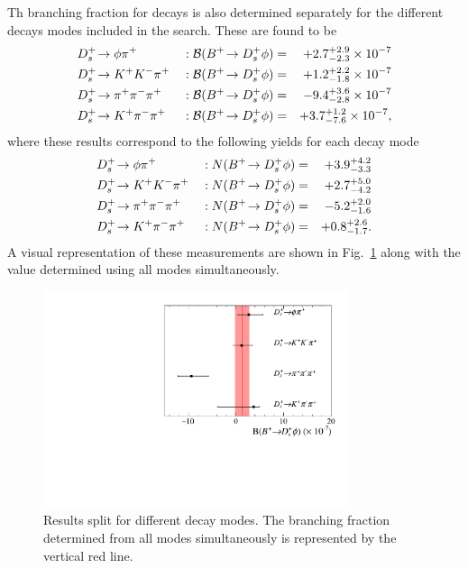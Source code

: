 {Th branching fraction for \decay{\Bp}{\Dsp\phiz} decays is also determined separately for the different \Dsp decays modes included in the search. These are found to be
\begin{equation}
  \left .
  \begin{aligned}
    &\decay{\Dsp}{\phiz\pip}      && : \BF(\decay{\Bp}{\Dsp\phiz}) = &+2.7^{+2.9}_{-2.3}\times 10^{-7}\\
    &\decay{\Dsp}{\Kp\Km\pip}     && : \BF(\decay{\Bp}{\Dsp\phiz}) = &+1.2^{+2.2}_{-1.8}\times 10^{-7}\\
    &\decay{\Dsp}{\pip\pim\pip}   && : \BF(\decay{\Bp}{\Dsp\phiz}) = &-9.4^{+3.6}_{-2.8}\times 10^{-7}\\
    &\decay{\Dsp}{\Kp\pim\pip}    && : \BF(\decay{\Bp}{\Dsp\phiz}) = &+3.7^{+1.2}_{-7.6}\times 10^{-7},\\
  \end{aligned} \right.
\end{equation} 
where these results correspond to the following yields for each \Dsp decay mode
\begin{equation}
  \left .
  \begin{aligned}
    &\decay{\Dsp}{\phiz\pip}      && : N(\decay{\Bp}{\Dsp\phiz}) = &+3.9^{+4.2}_{-3.3} \\
    &\decay{\Dsp}{\Kp\Km\pip}     && : N(\decay{\Bp}{\Dsp\phiz}) = &+2.7^{+5.0}_{-4.2} \\
    &\decay{\Dsp}{\pip\pim\pip}   && : N(\decay{\Bp}{\Dsp\phiz}) = &-5.2^{+2.0}_{-1.6} \\
    &\decay{\Dsp}{\Kp\pim\pip}    && : N(\decay{\Bp}{\Dsp\phiz}) = &+0.8^{+2.6}_{-1.7}. \\
  \end{aligned} \right.
\end{equation} 
A visual representation of these measurements are shown in Fig.~\ref{fig:B2DsPhi_split_Ds_results} along with the value determined using all modes simultaneously.

\begin{figure}[!h]
    \centering
        \includegraphics[width=0.8\textwidth]{figs/B2DsPhi/Split_Ds_modes.pdf}
        \caption{Results split for different \Dsp decay modes. The branching fraction determined from all modes simultaneously is represented by the vertical red line.}
    \label{fig:B2DsPhi_split_Ds_results}   
\end{figure}

}
